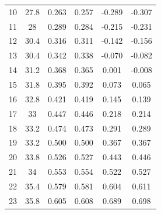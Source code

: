 \begin{table}[H]
\begin{tabular}{cccccc}
    10         & 27.8                      & 0.263                      & 0.257                       & -0.289                  & -0.307                  \\
    11         & 28                        & 0.289                      & 0.284                       & -0.215                  & -0.231                  \\
    12         & 30.4                      & 0.316                      & 0.311                       & -0.142                  & -0.156                  \\
    13         & 30.4                      & 0.342                      & 0.338                       & -0.070                  & -0.082                  \\
    14         & 31.2                      & 0.368                      & 0.365                       & 0.001                   & -0.008                  \\
    15         & 31.8                      & 0.395                      & 0.392                       & 0.073                   & 0.065                   \\
    16         & 32.8                      & 0.421                      & 0.419                       & 0.145                   & 0.139                   \\
    17         & 33                        & 0.447                      & 0.446                       & 0.218                   & 0.214                   \\
    18         & 33.2                      & 0.474                      & 0.473                       & 0.291                   & 0.289                   \\
    19         & 33.2                      & 0.500                      & 0.500                       & 0.367                   & 0.367                   \\
    20         & 33.8                      & 0.526                      & 0.527                       & 0.443                   & 0.446                   \\
    21         & 34                        & 0.553                      & 0.554                       & 0.522                   & 0.527                   \\
    22         & 35.4                      & 0.579                      & 0.581                       & 0.604                   & 0.611                   \\
    23         & 35.8                      & 0.605                      & 0.608                       & 0.689                   & 0.698                   \\

\end{tabular}
\end{table}

